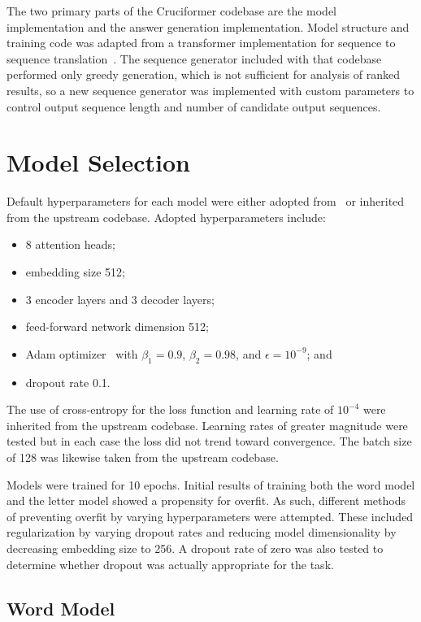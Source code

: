 \documentclass[letterpaper]{article} %
\begin{document}
\begin{NoHyper}
The two primary parts of the Cruciformer codebase are the model implementation and the answer generation implementation. Model structure and training code was adapted from a transformer implementation for sequence to sequence translation~\cite{chegde2022}. The sequence generator included with that codebase performed only greedy generation, which is not sufficient for analysis of ranked results, so a new sequence generator was implemented with custom parameters to control output sequence length and number of candidate output sequences.

\section{Model Selection}
\label{sec:model}

Default hyperparameters for each model were either adopted from~\citealp{vaswani2017} or inherited from the upstream codebase.
Adopted hyperparameters include:

\begin{itemize}
\item 8 attention heads;
\item embedding size 512;
\item 3 encoder layers and 3 decoder layers;
\item feed-forward network dimension 512;
\item Adam optimizer~\cite{kingma2017adam} with $\beta_1 = 0.9$, $\beta_2 = 0.98$, and $\epsilon = 10^{-9}$; and
\item dropout rate 0.1.
\end{itemize}

The use of cross-entropy for the loss function and learning rate of $10^{-4}$ were inherited from the upstream codebase.
Learning rates of greater magnitude were tested but in each case the loss did not trend toward convergence.
The batch size of 128 was likewise taken from the upstream codebase.

Models were trained for 10 epochs.
Initial results of training both the word model and the letter model showed a propensity for overfit.
As such, different methods of preventing overfit by varying hyperparameters were attempted.
These included regularization by varying dropout rates and reducing model dimensionality by decreasing embedding size to 256.
A dropout rate of zero was also tested to determine whether dropout was actually appropriate for the task.

\subsection{Word Model}
\label{subsec:word}


\end{NoHyper}
\end{document}
